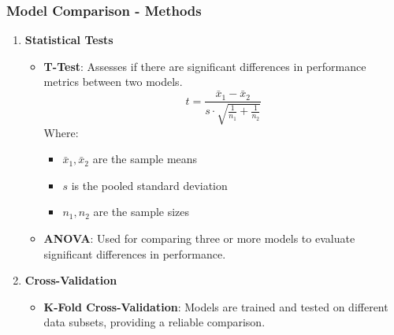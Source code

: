 \documentclass{beamer}
\begin{document}
\begin{frame}[fragile]
    \frametitle{Model Comparison - Methods}
    \begin{enumerate}
        \item \textbf{Statistical Tests}
        \begin{itemize}
            \item \textbf{T-Test}: Assesses if there are significant differences in performance metrics between two models.
                \begin{equation}
                t = \frac{\bar{x}_1 - \bar{x}_2}{s \cdot \sqrt{\frac{1}{n_1} + \frac{1}{n_2}}}
                \end{equation}
                Where:
                \begin{itemize}
                    \item $\bar{x}_1, \bar{x}_2$ are the sample means
                    \item $s$ is the pooled standard deviation
                    \item $n_1, n_2$ are the sample sizes
                \end{itemize}
            \item \textbf{ANOVA}: Used for comparing three or more models to evaluate significant differences in performance.
        \end{itemize}

        \item \textbf{Cross-Validation}
        \begin{itemize}
            \item \textbf{K-Fold Cross-Validation}: Models are trained and tested on different data subsets, providing a reliable comparison.
        \end{itemize}
    \end{enumerate}
\end{frame}
\end{document}
